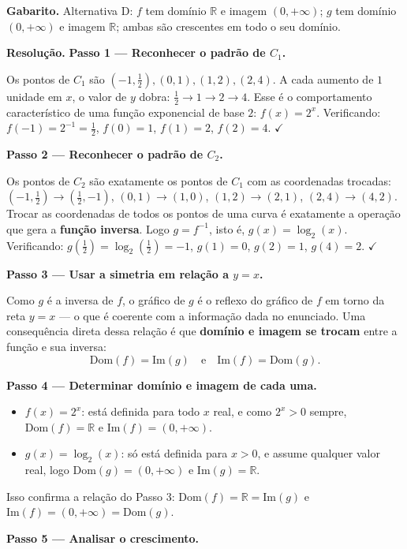 \documentclass[11pt,a4paper]{article}
\begin{document}
\textbf{Gabarito.} Alternativa D: $f$ tem domínio $\mathbb{R}$ e imagem $(0,+\infty)$; $g$ tem domínio $(0,+\infty)$ e imagem $\mathbb{R}$; ambas são crescentes em todo o seu domínio.

\textbf{Resolução.} \textbf{Passo 1 — Reconhecer o padrão de $C_1$.}

Os pontos de $C_1$ são $(-1,\tfrac12), (0,1), (1,2), (2,4)$. A cada aumento de $1$ unidade em $x$, o valor de $y$ dobra: $\tfrac12 \to 1 \to 2 \to 4$. Esse é o comportamento característico de uma função exponencial de base $2$: $f(x) = 2^x$. Verificando: $f(-1)=2^{-1}=\tfrac12$, $f(0)=1$, $f(1)=2$, $f(2)=4$. $\checkmark$

\textbf{Passo 2 — Reconhecer o padrão de $C_2$.}

Os pontos de $C_2$ são exatamente os pontos de $C_1$ com as coordenadas trocadas: $(-1,\tfrac12)\to(\tfrac12,-1)$, $(0,1)\to(1,0)$, $(1,2)\to(2,1)$, $(2,4)\to(4,2)$. Trocar as coordenadas de todos os pontos de uma curva é exatamente a operação que gera a \textbf{função inversa}. Logo $g = f^{-1}$, isto é, $g(x) = \log_2(x)$. Verificando: $g(\tfrac12)=\log_2(\tfrac12)=-1$, $g(1)=0$, $g(2)=1$, $g(4)=2$. $\checkmark$

\textbf{Passo 3 — Usar a simetria em relação a $y=x$.}

Como $g$ é a inversa de $f$, o gráfico de $g$ é o reflexo do gráfico de $f$ em torno da reta $y=x$ — o que é coerente com a informação dada no enunciado. Uma consequência direta dessa relação é que \textbf{domínio e imagem se trocam} entre a função e sua inversa:
$$\text{Dom}(f) = \text{Im}(g) \quad \text{e} \quad \text{Im}(f) = \text{Dom}(g).$$

\textbf{Passo 4 — Determinar domínio e imagem de cada uma.}

\begin{itemize}[nosep,leftmargin=*]
\item $f(x)=2^x$: está definida para todo $x$ real, e como $2^x>0$ sempre, $\text{Dom}(f)=\mathbb{R}$ e $\text{Im}(f)=(0,+\infty)$.
\item $g(x)=\log_2(x)$: só está definida para $x>0$, e assume qualquer valor real, logo $\text{Dom}(g)=(0,+\infty)$ e $\text{Im}(g)=\mathbb{R}$.
\end{itemize}

Isso confirma a relação do Passo 3: $\text{Dom}(f)=\mathbb{R}=\text{Im}(g)$ e $\text{Im}(f)=(0,+\infty)=\text{Dom}(g)$.

\textbf{Passo 5 — Analisar o crescimento.}
\end{document}
